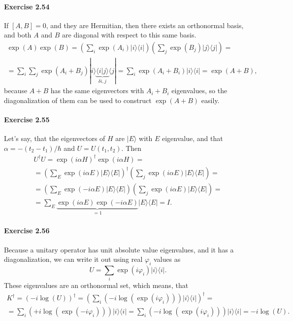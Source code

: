 \documentclass[a4paper,12pt]{article}
\newcommand{\exercise}[1]{\paragraph{Exercise #1}}
\newcommand{\la}{\langle}
\newcommand{\ra}{\rangle}
\begin{document}
    \exercise{2.54} If $[A, B] = 0$, and they are Hermitian, then there exists an orthonormal basis, and both $A$ and $B$ are diagonal with respect to this same basis.
    \begin{gather}
        \nonumber
        \exp(A) \exp(B) = \left( \sum_i \exp(A_i) | i \ra \la i | \right) \left( \sum_j \exp(B_j) | j \ra \la j | \right) = \\
        = 
        \sum_i \sum_j \exp(A_i + B_j) | i \ra \underbrace{\la i | j \ra}_{\delta{i, j}} \la j | = \sum_i \exp(A_i + B_i) | i \ra \la i | = \exp(A + B) \textrm{,}
    \end{gather}
    because $A + B$ has the same eigenvectors with $A_i + B_i$ eigenvalues, so the diagonalization of them can be used to construct $\exp(A + B)$ easily.
    
    \exercise{2.55} Let's say, that the eigenvectors of $H$ are $| E \ra$ with $E$ eigenvalue, and that $\alpha = -(t_2 - t_1)/\hbar$ and $U = U(t_1, t_2)$. Then
    \begin{gather}
        \nonumber
        U^\dagger U = \exp(i \alpha H)^\dagger \exp(i \alpha H) = \\
        \nonumber
        = \left( \sum_E \exp(i\alpha E) | E \ra \la E | \right)^\dagger \left( \sum_j \exp(i\alpha E) | E \ra \la E | \right) = \\
        \nonumber
        = \left( \sum_E \exp(-i\alpha E) | E \ra \la E | \right) \left( \sum_j \exp(i\alpha E) | E \ra \la E | \right) = \\
        = \sum_E \underbrace{\exp(i\alpha E) \exp(-i\alpha E)}_{= 1} | E \ra \la E | = I \textrm{.}
    \end{gather}

    \exercise{2.56} Because a unitary operator has unit absolute value eigenvalues, and it has a diagonalization, we can write it out using real $\varphi_i$ values as
    \begin{equation}
        U = \sum_i \exp(i \varphi_i) | i \ra \la i | \textrm{.}
    \end{equation}
    These eigenvalues are an orthonormal set, which means, that
    \begin{gather}
        \nonumber
        K^\dagger = (-i \log(U))^\dagger = \left( \sum_i (-i\log(\exp(i \varphi_i))) | i \ra \la i | \right)^\dagger = \\
        = \sum_i (+i\log(\exp(-i \varphi_i))) | i \ra \la i |
        = \sum_i (-i\log(\exp(i \varphi_i))) | i \ra \la i | = -i \log(U) \textrm{.}
    \end{gather}
\end{document}

